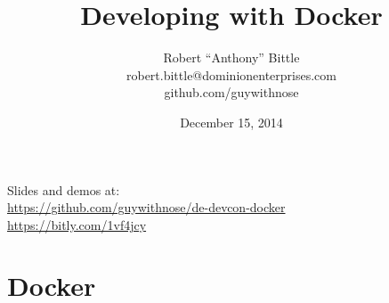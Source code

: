 \documentclass{beamer}
\title[Developing with Docker]{Developing with Docker}
\author{\hspace{12pt}Robert “Anthony” Bittle\hspace{12pt}\\\hspace{12pt}robert.bittle@dominionenterprises.com\hspace{12pt}\\\hspace{12pt}github.com/guywithnose\hspace{12pt}}
\date{December 15, 2014}
\begin{document}
    \begin{frame}
        \titlepage
        Slides and demos at:\\
        \href{https://github.com/guywithnose/de-devcon-docker}{https://github.com/guywithnose/de-devcon-docker}\\
        \href{https://bitly.com/1vf4jcy}{https://bitly.com/1vf4jcy}
    \end{frame}

    \section{Docker}
\end{document}
